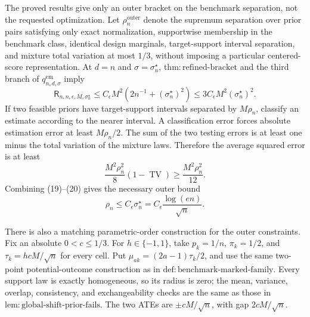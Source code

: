 The proved results give only an outer bracket on the benchmark separation, not the requested optimization.  Let \(\rho_n^{\mathrm{outer}}\) denote the supremum separation over prior pairs satisfying only exact normalization, supportwise membership in the benchmark class, identical design marginals, target-support interval separation, and mixture total variation at most \(1/3\), without imposing a particular centered-score representation.  At \(d=n\) and \(\sigma=\sigma_n^\star\), \(\mathrm{thm:refined\text{-}bracket}\) and the third branch of \(q_{n,d,\sigma}^{\mathrm{em}}\) imply
\[
 \mathsf R_{n,n,\epsilon,M,\sigma_n^\star}
 \leq C_{\epsilon}M^2(2n^{-1}+(\sigma_n^\star)^2)
 \leq3C_{\epsilon}M^2(\sigma_n^\star)^2. \tag{19}
\]
If two feasible priors have target-support intervals separated by \(M\rho_n\), classify an estimate according to the nearer interval.  A classification error forces absolute estimation error at least \(M\rho_n/2\).  The sum of the two testing errors is at least one minus the total variation of the mixture laws.  Therefore the average squared error is at least
\[
 \frac{M^2\rho_n^2}{8}(1-\operatorname{TV})
 \geq\frac{M^2\rho_n^2}{12}. \tag{20}
\]
Combining (19)--(20) gives the necessary outer bound
\[
 \rho_n\leq C_{\epsilon}\sigma_n^\star
 =C_{\epsilon}\frac{\log(en)}{\sqrt n}. \tag{21}
\]

There is also a matching parametric-order construction for the outer constraints.  Fix an absolute \(0<c\leq1/3\).  For \(h\in\{-1,1\}\), take \(p_k=1/n\), \(\pi_k=1/2\), and \(\tau_k=hcM/\sqrt n\) for every cell.  Put \(\mu_{ak}=(2a-1)\tau_k/2\), and use the same two-point potential-outcome construction as in \(\mathrm{def:benchmark\text{-}marked\text{-}family}\).  Every support law is exactly homogeneous, so its radius is zero; the mean, variance, overlap, consistency, and exchangeability checks are the same as those in \(\mathrm{lem:global\text{-}shift\text{-}prior\text{-}fails}\).  The two ATEs are \(\pm cM/\sqrt n\), with gap \(2cM/\sqrt n\).

